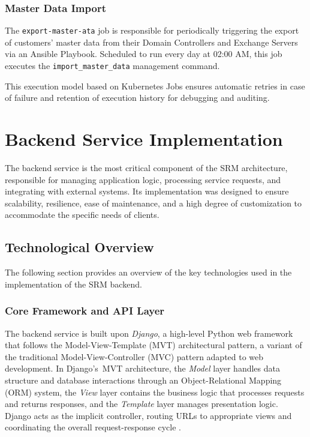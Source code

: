 \subsubsection{Master Data Import}
The \texttt{export-master-ata} job is responsible for periodically triggering the export of customers' master data from their Domain Controllers and Exchange Servers via an Ansible Playbook. Scheduled to run every day at 02:00 AM, this job executes the \texttt{import\_master\_data} management command.

This execution model based on Kubernetes Jobs ensures automatic retries in case of failure and retention of execution history for debugging and auditing.

\section{Backend Service Implementation}
The backend service is the most critical component of the SRM architecture, responsible for managing application logic, processing service requests, and integrating with external systems. Its implementation was designed to ensure scalability, resilience, ease of maintenance, and a high degree of customization to accommodate the specific needs of clients.

\subsection{Technological Overview}
The following section provides an overview of the key technologies used in the implementation of the SRM backend.

\subsubsection{Core Framework and API Layer}

The backend service is built upon \textit{Django}, a high-level Python web framework that follows the Model-View-Template (MVT) architectural pattern, a variant of the traditional Model-View-Controller (MVC) pattern adapted to web development. In Django's~MVT architecture, the \textit{Model} layer handles data structure and database interactions through an Object-Relational Mapping (ORM) system, the \textit{View} layer contains the business logic that processes requests and returns responses, and the \textit{Template} layer manages presentation logic. Django acts as the implicit controller, routing URLs to appropriate views and coordinating the overall request-response cycle \cite{django}.

